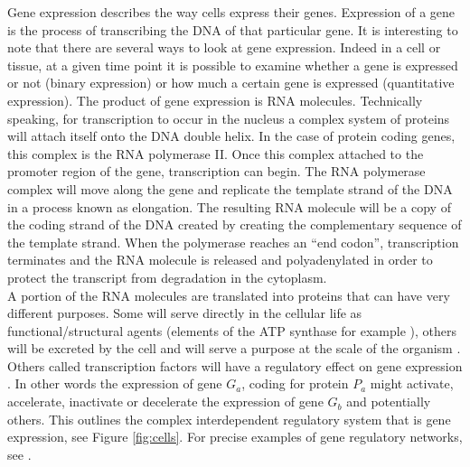 	Gene expression describes the way cells express their genes. Expression of a gene is the process of transcribing the DNA of that particular gene. It is interesting to note that there are several ways to look at gene expression. Indeed in a cell or tissue, at a given time point it is possible to examine whether a gene is expressed or not (binary expression) or how much a certain gene is expressed (quantitative expression). The product of gene expression is RNA molecules. Technically speaking, for transcription to occur in the nucleus a complex system of proteins will attach itself onto the DNA double helix. In the case of protein coding genes, this complex is the RNA polymerase II. Once this complex attached to the promoter region of the gene, transcription can begin. The RNA polymerase complex will move along the gene and replicate the template strand of the DNA in a process known as elongation. The resulting RNA molecule will be a copy of the coding strand of the DNA created by creating the complementary sequence of the template strand. When the polymerase reaches an ``end codon'', transcription terminates and the RNA molecule is released and polyadenylated in order to protect the transcript from degradation in the cytoplasm.\\
	
	A portion of the RNA molecules are translated into proteins that can have very different purposes. Some will serve directly in the cellular life as functional/structural agents (elements of the ATP synthase for example \cite{boyer97}), others will be excreted by the cell and will serve a purpose at the scale of the organism \cite{kaiser84}. Others called transcription factors will have a regulatory effect on gene expression \cite{mitchell89}. In other words the expression of gene $G_a$, coding for protein $P_a$ might activate, accelerate, inactivate or decelerate the expression of gene $G_b$ and potentially others. This outlines the complex interdependent regulatory system that is gene expression, see Figure \ref{fig:cells}. For precise examples of gene regulatory networks, see \cite{gossen92, shinozaki03,fuqua01,balmer02}.\\
	
